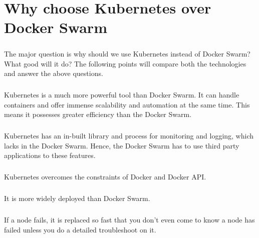 \chapter{Why choose Kubernetes over Docker Swarm}

\paragraph{\hspace{24pt}}
The major question is why should we use Kubernetes instead of Docker Swarm? What good will it do? The following points will compare both the technologies and answer the above questions.

\paragraph{\hspace{24pt}}
Kubernetes is a much more powerful tool than Docker Swarm. It can handle containers and offer immense scalability and automation at the same time. This means it possesses greater efficiency than the Docker Swarm.

\paragraph{\hspace{24pt}}
Kubernetes has an in-built library and process for monitoring and logging, which lacks in the Docker Swarm. Hence, the Docker Swarm has to use third party applications to these features.

\paragraph{\hspace{24pt}}
Kubernetes overcomes the constraints of Docker and Docker API.

\paragraph{\hspace{24pt}}
It is more widely deployed than Docker Swarm.

\paragraph{\hspace{24pt}}
If a node fails, it is replaced so fast that you don’t even come to know a node has failed unless you do a detailed troubleshoot on it.

